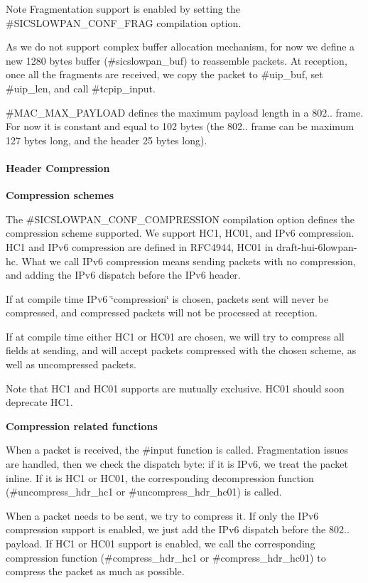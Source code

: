 \begin{DoxyNote}{\-Note}
\-Fragmentation support is enabled by setting the \#\-S\-I\-C\-S\-L\-O\-W\-P\-A\-N\-\_\-\-C\-O\-N\-F\-\_\-\-F\-R\-A\-G compilation option.

\-As we do not support complex buffer allocation mechanism, for now we define a new 1280 bytes buffer (\#sicslowpan\-\_\-buf) to reassemble packets. \-At reception, once all the fragments are received, we copy the packet to \#uip\-\_\-buf, set \#uip\-\_\-len, and call \#tcpip\-\_\-input.

\#\-M\-A\-C\-\_\-\-M\-A\-X\-\_\-\-P\-A\-Y\-L\-O\-A\-D defines the maximum payload length in a 802.. frame. \-For now it is constant and equal to 102 bytes (the 802.. frame can be maximum 127 bytes long, and the header 25 bytes long).
\end{DoxyNote}
\hypertarget{a00056_hc}{}\paragraph{\-Header Compression}\label{a00056_hc}
{\bfseries \-Compression schemes}\par
 \-The \#\-S\-I\-C\-S\-L\-O\-W\-P\-A\-N\-\_\-\-C\-O\-N\-F\-\_\-\-C\-O\-M\-P\-R\-E\-S\-S\-I\-O\-N compilation option defines the compression scheme supported. \-We support \-H\-C1, \-H\-C01, and \-I\-Pv6 compression. \-H\-C1 and \-I\-Pv6 compression are defined in \-R\-F\-C4944, \-H\-C01 in draft-\/hui-\/6lowpan-\/hc. \-What we call \-I\-Pv6 compression means sending packets with no compression, and adding the \-I\-Pv6 dispatch before the \-I\-Pv6 header.\par
 \-If at compile time \-I\-Pv6 \char`\"{}compression\char`\"{} is chosen, packets sent will never be compressed, and compressed packets will not be processed at reception.\par
 \-If at compile time either \-H\-C1 or \-H\-C01 are chosen, we will try to compress all fields at sending, and will accept packets compressed with the chosen scheme, as well as uncompressed packets.\par
 \-Note that \-H\-C1 and \-H\-C01 supports are mutually exclusive. \-H\-C01 should soon deprecate \-H\-C1.

{\bfseries \-Compression related functions}\par
 \-When a packet is received, the \#input function is called. \-Fragmentation issues are handled, then we check the dispatch byte\-: if it is \-I\-Pv6, we treat the packet inline. \-If it is \-H\-C1 or \-H\-C01, the corresponding decompression function (\#uncompress\-\_\-hdr\-\_\-hc1 or \#uncompress\-\_\-hdr\-\_\-hc01) is called.\par
 \-When a packet needs to be sent, we try to compress it. \-If only the \-I\-Pv6 compression support is enabled, we just add the \-I\-Pv6 dispatch before the 802.. payload. \-If \-H\-C1 or \-H\-C01 support is enabled, we call the corresponding compression function (\#compress\-\_\-hdr\-\_\-hc1 or \#compress\-\_\-hdr\-\_\-hc01) to compress the packet as much as possible.


